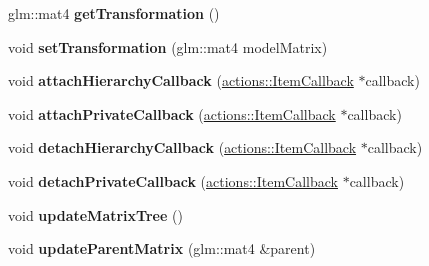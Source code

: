 \begin{DoxyCompactItemize}
\item 
\hypertarget{classfillwave_1_1models_1_1Entity_a0b4448ce50783fe805c1c2d53e02d8de}{}glm\+::mat4 {\bfseries get\+Transformation} ()\label{classfillwave_1_1models_1_1Entity_a0b4448ce50783fe805c1c2d53e02d8de}

\item 
\hypertarget{classfillwave_1_1models_1_1Entity_ab3b721b4d7e31c4427e875be54138fc0}{}void {\bfseries set\+Transformation} (glm\+::mat4 model\+Matrix)\label{classfillwave_1_1models_1_1Entity_ab3b721b4d7e31c4427e875be54138fc0}

\item 
\hypertarget{classfillwave_1_1models_1_1Entity_a63d67b1d8a5d5c232c1a40db39d263e7}{}void {\bfseries attach\+Hierarchy\+Callback} (\hyperlink{classfillwave_1_1actions_1_1ItemCallback}{actions\+::\+Item\+Callback} $\ast$callback)\label{classfillwave_1_1models_1_1Entity_a63d67b1d8a5d5c232c1a40db39d263e7}

\item 
\hypertarget{classfillwave_1_1models_1_1Entity_a2f09305545cb13a242df3a2de32798d8}{}void {\bfseries attach\+Private\+Callback} (\hyperlink{classfillwave_1_1actions_1_1ItemCallback}{actions\+::\+Item\+Callback} $\ast$callback)\label{classfillwave_1_1models_1_1Entity_a2f09305545cb13a242df3a2de32798d8}

\item 
\hypertarget{classfillwave_1_1models_1_1Entity_a880349eb2ec5124b57ef779a572748a7}{}void {\bfseries detach\+Hierarchy\+Callback} (\hyperlink{classfillwave_1_1actions_1_1ItemCallback}{actions\+::\+Item\+Callback} $\ast$callback)\label{classfillwave_1_1models_1_1Entity_a880349eb2ec5124b57ef779a572748a7}

\item 
\hypertarget{classfillwave_1_1models_1_1Entity_a3ce284d090d050331889fd46af82152e}{}void {\bfseries detach\+Private\+Callback} (\hyperlink{classfillwave_1_1actions_1_1ItemCallback}{actions\+::\+Item\+Callback} $\ast$callback)\label{classfillwave_1_1models_1_1Entity_a3ce284d090d050331889fd46af82152e}

\item 
\hypertarget{classfillwave_1_1models_1_1Entity_aef0790065a393c9cece4a6ab3f997ce9}{}void {\bfseries update\+Matrix\+Tree} ()\label{classfillwave_1_1models_1_1Entity_aef0790065a393c9cece4a6ab3f997ce9}

\item 
\hypertarget{classfillwave_1_1models_1_1Entity_ae3ecab5cfb2400faa1cb76de8e252d4d}{}void {\bfseries update\+Parent\+Matrix} (glm\+::mat4 \&parent)\label{classfillwave_1_1models_1_1Entity_ae3ecab5cfb2400faa1cb76de8e252d4d}


\end{DoxyCompactItemize}
